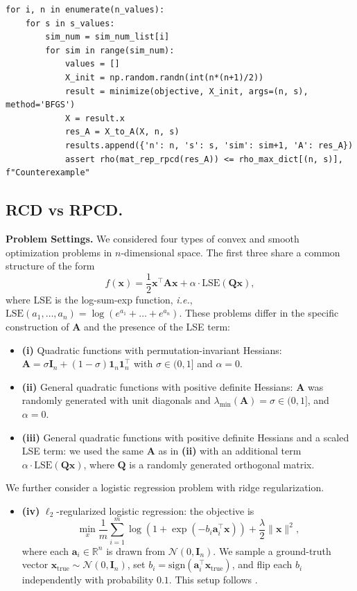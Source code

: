 \documentclass{article}
\theoremstyle{plain}
\theoremstyle{definition}
\theoremstyle{remark}
\def\vone{{\bm{1}}}
\def\va{{\bm{a}}}
\def\vx{{\bm{x}}}
\def\mA{{\bm{A}}}
\def\mI{{\bm{I}}}
\def\mQ{{\bm{Q}}}
\begin{document}
\begin{verbatim}
for i, n in enumerate(n_values):
    for s in s_values:
        sim_num = sim_num_list[i]
        for sim in range(sim_num):
            values = []
            X_init = np.random.randn(int(n*(n+1)/2))
            result = minimize(objective, X_init, args=(n, s), method='BFGS')
            X = result.x
            res_A = X_to_A(X, n, s)
            results.append({'n': n, 's': s, 'sim': sim+1, 'A': res_A})
            assert rho(mat_rep_rpcd(res_A)) <= rho_max_dict[(n, s)], f"Counterexample"
\end{verbatim}

\subsection{RCD vs RPCD.}
\label{sec:f.2}

\textbf{Problem Settings.}
We considered four types of convex and smooth optimization problems in $n$-dimensional space. The first three share a common structure of the form
\[f(\vx) = \frac{1}{2} \vx^{\top} \mA \vx + \alpha \cdot \text{LSE} (\mQ \vx),
\]
where LSE is the log-sum-exp function, {\it i.e.}, $\text{LSE}(a_1, \dots, a_n) = \log(e^{a_1} + \dots + e^{a_n})$. These problems differ in the specific construction of $\mA$ and the presence of the LSE term:
\begin{itemize}
    \item \textbf{(i)} Quadratic functions with permutation-invariant Hessians: $\mA = \sigma \mI_n + (1 - \sigma) \vone_n \vone_n^{\top}$ with $\sigma \in (0, 1]$ and $\alpha = 0$.
    \item \textbf{(ii)} General quadratic functions with positive definite Hessians: $\mA$ was randomly generated with unit diagonals and $\lambda_{\min} (\mA) = \sigma \in (0, 1]$, and $\alpha = 0$.
    \item \textbf{(iii)} General quadratic functions with positive definite Hessians and a scaled LSE term: we used the same $\mA$ as in \textbf{(ii)} with an additional term $\alpha \cdot \text{LSE} (\mQ \vx)$, where $\mQ$ is a randomly generated orthogonal matrix.
\end{itemize}
We further consider a logistic regression problem with ridge regularization.
\begin{itemize}
    \item \textbf{(iv)} $\ell_2$-regularized logistic regression: the objective is
    \[
    \min_x \frac{1}{m} \sum_{i=1}^{m} \log(1 + \exp(-b_i \va_i^{\top} \vx)) + \frac{\lambda}{2} \|\vx\|^2,
    \]
    where each $\va_i \in \mathbb{R}^n$ is drawn from $\mathcal{N}(0, \mI_n)$. We sample a ground-truth vector $\vx_{\text{true}} \sim \mathcal{N}(0, \mI_n)$, set $b_i = \text{sign}(\va_i^\top \vx_{\text{true}})$, and flip each $b_i$ independently with probability $0.1$. This setup follows \citet{nutini2015}.
\end{itemize}
\end{document}
